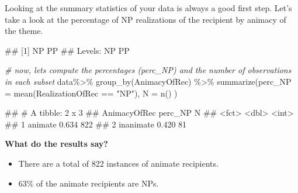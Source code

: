 \documentclass[
]{book}
\newenvironment{Shaded}{\begin{snugshade}}{\end{snugshade}}
\newcommand{\AttributeTok}[1]{\textcolor[rgb]{0.77,0.63,0.00}{#1}}
\newcommand{\CommentTok}[1]{\textcolor[rgb]{0.56,0.35,0.01}{\textit{#1}}}
\newcommand{\FunctionTok}[1]{\textcolor[rgb]{0.00,0.00,0.00}{#1}}
\newcommand{\NormalTok}[1]{#1}
\newcommand{\SpecialCharTok}[1]{\textcolor[rgb]{0.00,0.00,0.00}{#1}}
\newcommand{\StringTok}[1]{\textcolor[rgb]{0.31,0.60,0.02}{#1}}
\providecommand{\tightlist}{%
  \setlength{\itemsep}{0pt}\setlength{\parskip}{0pt}}
\begin{document}
Looking at the summary statistics of your data is always a good first step. Let's take a look at the percentage of NP realizations of the recipient by animacy of the theme.

\begin{Shaded}
\end{Shaded}

\begin{Shaded}
\begin{Highlighting}[]
\NormalTok{\#\# [1] NP PP}
\NormalTok{\#\# Levels: NP PP}
\end{Highlighting}
\end{Shaded}

\begin{Shaded}
\begin{Highlighting}[]
\CommentTok{\# now, let\textquotesingle{}s compute the percentages (perc\_NP) and the number of observations in each subset}
\NormalTok{data}\SpecialCharTok{\%\textgreater{}\%} 
  \FunctionTok{group\_by}\NormalTok{(AnimacyOfRec) }\SpecialCharTok{\%\textgreater{}\%} 
  \FunctionTok{summarize}\NormalTok{(}\AttributeTok{perc\_NP =} \FunctionTok{mean}\NormalTok{(RealizationOfRec }\SpecialCharTok{==} \StringTok{"NP"}\NormalTok{), }
                   \AttributeTok{N =} \FunctionTok{n}\NormalTok{()}
\NormalTok{                  )}
\end{Highlighting}
\end{Shaded}

\begin{Shaded}
\begin{Highlighting}[]
\NormalTok{\#\# \# A tibble: 2 x 3}
\NormalTok{\#\#   AnimacyOfRec perc\_NP     N}
\NormalTok{\#\#   \textless{}fct\textgreater{}          \textless{}dbl\textgreater{} \textless{}int\textgreater{}}
\NormalTok{\#\# 1 animate        0.634   822}
\NormalTok{\#\# 2 inanimate      0.420    81}
\end{Highlighting}
\end{Shaded}

\textbf{What do the results say?}

\begin{itemize}
\tightlist
\item
  There are a total of 822 instances of animate recipients.
\item
  63\% of the animate recipients are NPs.
\end{itemize}
\end{document}
